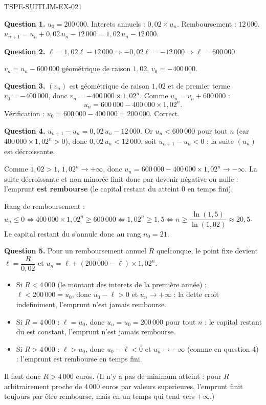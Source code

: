 \begin{corrige}{TSPE-SUITLIM-EX-021}

\textbf{Question 1.} $u_0 = 200\,000$. Interets annuels : $0{,}02 \times u_n$. Remboursement : $12\,000$. $u_{n+1} = u_n + 0{,}02\,u_n - 12\,000 = 1{,}02\,u_n - 12\,000$.

\textbf{Question 2.} $\ell = 1{,}02\ell - 12\,000 \Rightarrow -0{,}02\ell = -12\,000 \Rightarrow \ell = 600\,000$.

$v_n = u_n - 600\,000$ géométrique de raison $1{,}02$, $v_0 = -400\,000$.

\textbf{Question 3.} $(v_n)$ est géométrique de raison $1{,}02$ et de premier terme $v_0 = -400\,000$, donc $v_n = -400\,000 \times 1{,}02^n$. Comme $u_n = v_n + 600\,000$ :
\[
u_n = 600\,000 - 400\,000 \times 1{,}02^n.
\]
Vérification : $u_0 = 600\,000 - 400\,000 = 200\,000$. Correct.

\textbf{Question 4.} $u_{n+1} - u_n = 0{,}02\,u_n - 12\,000$. Or $u_n < 600\,000$ pour tout $n$ (car $400\,000 \times 1{,}02^n > 0$), donc $0{,}02\,u_n < 12\,000$, soit $u_{n+1} - u_n < 0$ : la suite $(u_n)$ est décroissante.

Comme $1{,}02 > 1$, $1{,}02^n \to +\infty$, donc $u_n = 600\,000 - 400\,000 \times 1{,}02^n \to -\infty$. La suite décroissante et non minorée finit donc par devenir négative ou nulle : l'emprunt \textbf{est rembourse} (le capital restant du atteint $0$ en temps fini).

Rang de remboursement : $u_n \leq 0 \iff 400\,000 \times 1{,}02^n \geq 600\,000 \iff 1{,}02^n \geq 1{,}5 \iff n \geq \dfrac{\ln(1{,}5)}{\ln(1{,}02)} \approx 20{,}5$. Le capital restant du s'annule donc au rang $\boxed{n_0 = 21}$.

\textbf{Question 5.} Pour un remboursement annuel $R$ quelconque, le point fixe devient $\ell = \dfrac{R}{0{,}02}$ et $u_n = \ell + (200\,000 - \ell) \times 1{,}02^n$.

\begin{itemize}
  \item Si $R < 4\,000$ (le montant des interets de la première année) : $\ell < 200\,000 = u_0$, donc $u_0 - \ell > 0$ et $u_n \to +\infty$ : la dette croit indefiniment, l'emprunt n'est jamais rembourse.
  \item Si $R = 4\,000$ : $\ell = u_0$, donc $u_n = u_0 = 200\,000$ pour tout $n$ : le capital restant du est constant, l'emprunt n'est jamais rembourse.
  \item Si $R > 4\,000$ : $\ell > u_0$, donc $u_0 - \ell < 0$ et $u_n \to -\infty$ (comme en question 4) : l'emprunt est rembourse en temps fini.
\end{itemize}

Il faut donc $R > 4\,000$ euros. (Il n'y a pas de minimum atteint : pour $R$ arbitrairement proche de $4\,000$ euros par valeurs superieures, l'emprunt finit toujours par être rembourse, mais en un temps qui tend vers $+\infty$.)

\end{corrige}
